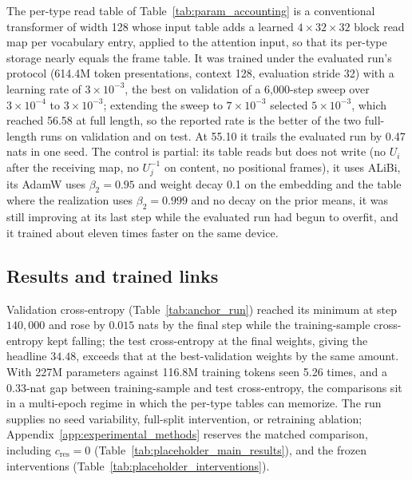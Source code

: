 \documentclass[twoside,11pt]{article}
\begin{document}
The per-type read table of Table~\ref{tab:param_accounting} is a conventional transformer of width 128 whose input table adds a learned $4\times32\times32$ block read map per vocabulary entry, applied to the attention input, so that its per-type storage nearly equals the frame table. It was trained under the evaluated run's protocol (614.4M token presentations, context 128, evaluation stride 32) with a learning rate of $3\times10^{-3}$, the best on validation of a 6,000-step sweep over $3\times10^{-4}$ to $3\times10^{-3}$; extending the sweep to $7\times10^{-3}$ selected $5\times10^{-3}$, which reached 56.58 at full length, so the reported rate is the better of the two full-length runs on validation and on test. At 55.10 it trails the evaluated run by 0.47 nats in one seed. The control is partial: its table reads but does not write (no $U_i$ after the receiving map, no $U_j^{-1}$ on content, no positional frames), it uses ALiBi, its AdamW uses $\beta_2=0.95$ and weight decay 0.1 on the embedding and the table where the realization uses $\beta_2=0.999$ and no decay on the prior means, it was still improving at its last step while the evaluated run had begun to overfit, and it trained about eleven times faster on the same device. %

\subsection{Results and trained links}
\label{sec:lm_results}

Validation cross-entropy (Table~\ref{tab:anchor_run}) reached its minimum at step $140{,}000$ and rose by $0.015$ nats by the final step while the training-sample cross-entropy kept falling; the test cross-entropy at the final weights, giving the headline $34.48$, exceeds that at the best-validation weights by the same amount. With 227M parameters against 116.8M training tokens seen 5.26 times, and a 0.33-nat gap between training-sample and test cross-entropy, the comparisons sit in a multi-epoch regime in which the per-type tables can memorize. %
The run supplies no seed variability, full-split intervention, or retraining ablation; Appendix~\ref{app:experimental_methods} reserves the matched comparison, including $c_{\mathrm{res}}=0$ (Table~\ref{tab:placeholder_main_results}), and the frozen interventions (Table~\ref{tab:placeholder_interventions}).
\end{document}
